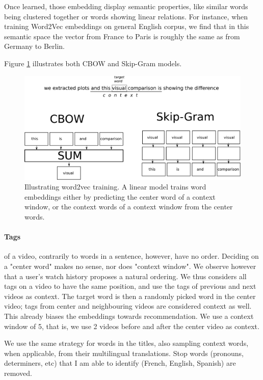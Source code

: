 Once learned, those embedding display semantic properties, like similar words being clustered together or words showing linear relations. For instance, when training Word2Vec embeddings on general English corpus, we find that in this semantic space the vector from France to Paris is roughly the same as from Germany to Berlin.

Figure \ref{fig:word2vec} illustrates both CBOW and Skip-Gram models.

\begin{figure}
    \centering
    \includegraphics[width=\columnwidth]{70-files/word2vec.pdf}
    \caption{Illustrating word2vec training. A linear model trains word embeddings either by predicting the center word of a context window, or the context words of a context window from the center words.}
    \label{fig:word2vec}
\end{figure}

\paragraph{Tags} of a video, contrarily to words in a sentence, however, have no order. Deciding on a "center word" makes no sense, nor does "context window". We observe however that a user's watch history proposes a natural ordering. We thus considers all tags on a video to have the same position, and use the tags of previous and next videos as context. The target word is then a randomly picked word in the center video; tags from center and neighbouring videos are considered context as well. This already biases the embeddings towards recommendation. We use a context window of 5, that is, we use 2 videos before and after the center video as context.


We use the same strategy for words in the titles, also sampling context words, when applicable, from their multilingual translations. Stop words (pronouns, determiners, etc) that I am able to identify (French, English, Spanish) are removed.

